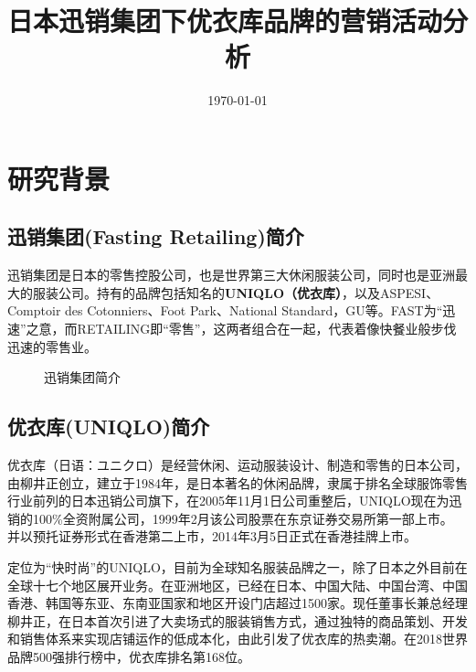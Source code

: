 \documentclass{xjtureport}
\title{日本迅销集团下优衣库品牌的营销活动分析}
\date{\today}
\begin{document}
\makecover
{}

\thispagestyle{fancy}

\rfoot{\thepage}
\section{研究背景}
\subsection{迅销集团(Fasting Retailing)简介}
迅销集团\cite{ref1}是日本的零售控股公司，也是世界第三大休闲服装公司，同时也是亚洲最大的服装公司。持有的品牌包括知名的\textbf{UNIQLO（优衣库）}，以及ASPESI、Comptoir des Cotonniers、Foot Park、National Standard，GU等。FAST为“迅速”之意，而RETAILING即“零售”，这两者组合在一起，代表着像快餐业般步伐迅速的零售业。
\begin{figure}[H]
    \centering
    \caption{迅销集团简介}
\end{figure}
\subsection{优衣库(UNIQLO)简介}
优衣库（日语：ユニクロ）是经营休闲、运动服装设计、制造和零售的日本公司，由柳井正创立，建立于1984年，是日本著名的休闲品牌，隶属于排名全球服饰零售行业前列的日本迅销公司旗下，在2005年11月1日公司重整后，UNIQLO现在为迅销的100\%全资附属公司，1999年2月该公司股票在东京证券交易所第一部上市\cite{ref2}。 并以预托证券形式在香港第二上市，2014年3月5日正式在香港挂牌上市。


定位为“快时尚”的UNIQLO，目前为全球知名服装品牌之一，除了日本之外目前在全球十七个地区展开业务。在亚洲地区，已经在日本、中国大陆、中国台湾、中国香港、韩国等东亚、东南亚国家和地区开设门店超过1500家。现任董事长兼总经理柳井正，在日本首次引进了大卖场式的服装销售方式，通过独特的商品策划、开发和销售体系来实现店铺运作的低成本化，由此引发了优衣库的热卖潮。在2018世界品牌500强排行榜中，优衣库排名第168位。
\end{document}
